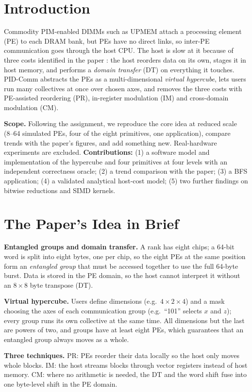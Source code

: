 \documentclass[conference]{IEEEtran}
\begin{document}
\section{Introduction}
Commodity PIM-enabled DIMMs such as UPMEM attach a processing element (PE) to each DRAM bank, but PEs have no direct links, so inter-PE communication goes through the host CPU. The host is slow at it because of three costs identified in the paper \cite{b1}: the host reorders data on its own, stages it in host memory, and performs a \emph{domain transfer} (DT) on everything it touches. PID-Comm abstracts the PEs as a multi-dimensional \emph{virtual hypercube}, lets users run many collectives at once over chosen axes, and removes the three costs with PE-assisted reordering (PR), in-register modulation (IM) and cross-domain modulation (CM).

\textbf{Scope.} Following the assignment, we reproduce the core idea at reduced scale (8--64 simulated PEs, four of the eight primitives, one application), compare trends with the paper's figures, and add something new. Real-hardware experiments are excluded. \textbf{Contributions:} (1) a software model and implementation of the hypercube and four primitives at four levels with an independent correctness oracle; (2) a trend comparison with the paper; (3) a BFS application; (4) a validated analytical host-cost model; (5) two further findings on bitwise reductions and SIMD kernels.

\section{The Paper's Idea in Brief}
\textbf{Entangled groups and domain transfer.} A rank has eight chips; a 64-bit word is split into eight bytes, one per chip, so the eight PEs at the same position form an \emph{entangled group} that must be accessed together to use the full 64-byte burst. Data is stored in the PE domain, so the host cannot interpret it without an $8\times8$ byte transpose (DT).

\textbf{Virtual hypercube.} Users define dimensions (e.g.\ $4\times2\times4$) and a mask choosing the axes of each communication group (e.g.\ ``101'' selects $x$ and $z$); every group runs its own collective at the same time. All dimensions but the last are powers of two, and groups have at least eight PEs, which guarantees that an entangled group always moves as a whole.

\textbf{Three techniques.} PR: PEs reorder their data locally so the host only moves whole blocks. IM: the host streams blocks through vector registers instead of host memory. CM: where no arithmetic is needed, the DT and the word shift fuse into one byte-level shift in the PE domain.
\end{document}
